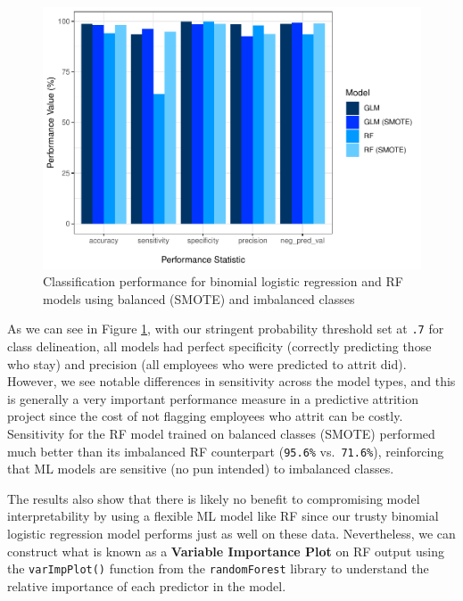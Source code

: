 \documentclass[
]{book}
\begin{document}
\begin{figure}

{\centering \includegraphics[width=1\linewidth]{The_Fundamentals_of_People_Analytics_files/figure-latex/class-mdl-perf-1} 

}

\caption{Classification performance for binomial logistic regression and RF models using balanced (SMOTE) and imbalanced classes}\label{fig:class-mdl-perf}
\end{figure}

As we can see in Figure \ref{fig:class-mdl-perf}, with our stringent probability threshold set at \texttt{.7} for class delineation, all models had perfect specificity (correctly predicting those who stay) and precision (all employees who were predicted to attrit did). However, we see notable differences in sensitivity across the model types, and this is generally a very important performance measure in a predictive attrition project since the cost of not flagging employees who attrit can be costly. Sensitivity for the RF model trained on balanced classes (SMOTE) performed much better than its imbalanced RF counterpart (\texttt{95.6\%} vs.~\texttt{71.6\%}), reinforcing that ML models are sensitive (no pun intended) to imbalanced classes.

The results also show that there is likely no benefit to compromising model interpretability by using a flexible ML model like RF since our trusty binomial logistic regression model performs just as well on these data. Nevertheless, we can construct what is known as a \textbf{Variable Importance Plot} on RF output using the \texttt{varImpPlot()} function from the \texttt{randomForest} library to understand the relative importance of each predictor in the model.
\end{document}
